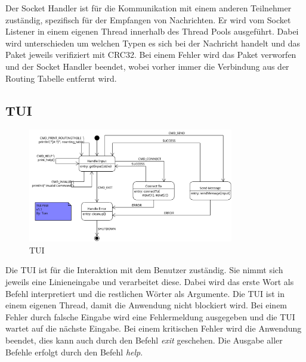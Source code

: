 Der Socket Handler ist für die Kommunikation mit einem anderen Teilnehmer zuständig, spezifisch für der Empfangen von Nachrichten.
Er wird vom Socket Listener in einem eigenen Thread innerhalb des Thread Pools ausgeführt. 
Dabei wird unterschieden um welchen Typen es sich bei der Nachricht handelt und das Paket jeweils verifiziert mit CRC32.
Bei einem Fehler wird das Paket verworfen und der Socket Handler beendet,
 wobei vorher immer die Verbindung aus der Routing Tabelle entfernt wird.

 \subsection{TUI}

\begin{figure}[H]
\centering
\includegraphics[width=0.8\textwidth]{images/tui.png}
\caption{TUI}
\label{fig:TUI}
\end{figure}

Die TUI ist für die Interaktion mit dem Benutzer zuständig. Sie nimmt sich jeweils eine Linieneingabe und verarbeitet diese.
Dabei wird das erste Wort als Befehl interpretiert und die restlichen Wörter als Argumente.
Die TUI ist in einem eigenen Thread, damit die Anwendung nicht blockiert wird.
Bei einem Fehler durch falsche Eingabe wird eine Fehlermeldung ausgegeben und die TUI wartet auf die nächste Eingabe.
Bei einem kritischen Fehler wird die Anwendung beendet, dies kann auch durch den Befehl \textit{exit} geschehen.
Die Ausgabe aller Befehle erfolgt durch den Befehl \textit{help}.